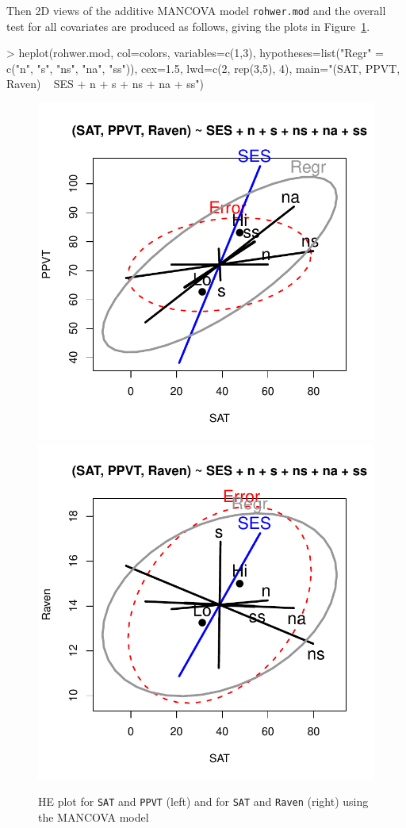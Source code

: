 \documentclass[11pt]{article}
\newcommand{\figref}[1]{Figure~\ref{#1}}
\newcommand{\code}[1]{{\texttt{#1}}}
\begin{document}
Then 2D views of the
additive MANCOVA model \code{rohwer.mod} and the overall test for all covariates
are produced as follows, giving the plots in \figref{fig:rohwer-HE2}.
\begin{Schunk}
\end{Schunk}
\begin{Schunk}
\begin{Sinput}
> heplot(rohwer.mod, col=colors,  variables=c(1,3),
        hypotheses=list("Regr" = c("n", "s", "ns", "na", "ss")),
        cex=1.5, lwd=c(2, rep(3,5), 4),
        main="(SAT, PPVT, Raven) ~ SES + n + s + ns + na + ss")
\end{Sinput}
\end{Schunk}

\begin{figure}[htb]
\begin{center}
	\includegraphics[width=.48\textwidth, trim=0 30 0 30]{fig/plot-rohwer-HE2}
	\includegraphics[width=.48\textwidth, trim=0 30 0 30]{fig/plot-rohwer-HE3}
\caption{HE plot for \code{SAT} and \code{PPVT} (left) and for 
	\code{SAT} and \code{Raven} (right) using the MANCOVA model }
\label{fig:rohwer-HE2}
\end{center}
\end{figure}
\end{document}
